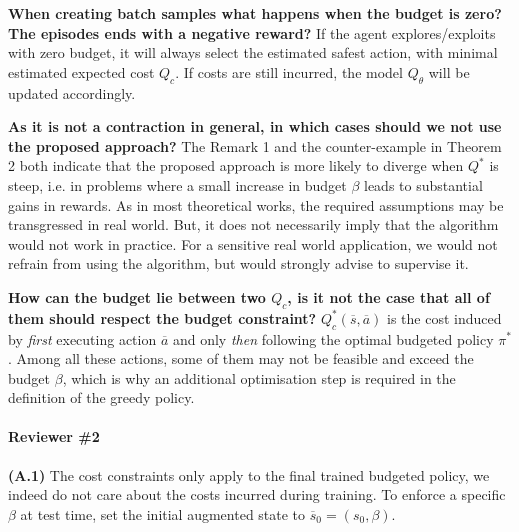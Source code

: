 \documentclass{article}
\begin{document}
\textbf{When creating batch samples what happens when the budget is zero? The episodes ends with a negative reward?} If the agent explores/exploits with zero budget, it will always select the estimated safest action, with minimal estimated expected cost $Q_c$. If costs are still incurred, the model $Q_\theta$ will be updated accordingly.

\textbf{As it is not a contraction in general, in which cases
should we not use the proposed approach?} The Remark 1 and the counter-example in Theorem 2 both indicate that the proposed approach is more likely to diverge when $Q^*$ is steep, i.e. in problems where a small increase in budget $\beta$ leads to substantial gains in rewards. As in most theoretical works, the required assumptions may be transgressed in real world. But, it does not necessarily imply that the algorithm would not work in practice. For a sensitive real world application, we would not refrain from using the algorithm, but would strongly advise to supervise it.%

\textbf{How can the budget lie between two $Q_c$, is it not the case that all of
them should respect the budget constraint?}
$Q^*_c(\overline{s},\overline{a})$ is the cost induced by \textit{first} executing action $\overline{a}$ and only \textit{then} following the optimal budgeted policy $\pi^*$. Among all these actions, some of them may not be feasible and exceed the budget $\beta$, which is why an additional optimisation step is required in the definition of the greedy policy.

\paragraph{\large Reviewer \#2}

\textbf{(A.1)} 
The cost constraints only apply to the final trained budgeted policy, we indeed do not care about the costs incurred during training. To enforce a specific $\beta$ at test time, set the initial augmented state to $\overline{s}_0 =(s_0,\beta)$.
\end{document}
